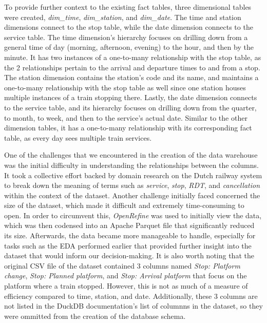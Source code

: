 To provide further context to the existing fact tables, three dimensional tables were created, \textit{dim\_time}, \textit{dim\_station}, and \textit{dim\_date}. 
The time and station dimensions connect to the stop table, while the date dimension connects to the service table. The time dimension's hierarchy focuses on drilling down 
from a general time of day (morning, afternoon, evening) to the hour, and then by the minute. It has two instances of a one-to-many relationship with the stop table, as the 
2 relationships pertain to the arrival and departure times to and from a stop. The station dimension contains the station's code and its name, and maintains a one-to-many 
relationship with the stop table as well since one station houses multiple instances of a train stopping there. Lastly, the date dimension connects to the service table, and its 
hierarchy focuses on drilling down from the quarter, to month, to week, and then to the service's actual date. Similar to the other dimension tables, it has a one-to-many 
relationship with its corresponding fact table, as every day sees multiple train services.

One of the challenges that we encountered in the creation of the data warehouse was the initial difficulty in understanding the relationships between the columns. It took 
a collective effort backed by domain research on the Dutch railway system to break down the meaning of terms such as \textit{service}, \textit{stop}, \textit{RDT}, and 
\textit{cancellation} within the context of the dataset. Another challenge initially faced concerned the size of the dataset, which made it difficult and extremely time-consuming 
to open. In order to circumvent this, \textit{OpenRefine} was used to initially view the data, which was then codensed into an Apache Parquet file that significantly reduced its size. 
Afterwards, the data became more manageable to handle, especially for tasks such as the EDA performed earlier that provided further insight into the dataset that would inform our
decision-making. It is also worth noting that the original CSV file of the dataset contained 3 columns named \textit{Stop: Platform change}, \textit{Stop: Planned 
platform}, and \textit{Stop: Arrival platform}  that focus on the platform where a train stopped. However, this is not as much of a measure of efficiency compared to time, 
station, and date. Additionally, these 3 columns are not listed in the DuckDB documentation's list of columnns in the dataset, so they were ommitted 
from the creation of the database schema. 
